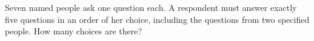 Seven named people ask one question each. A respondent must answer exactly five questions in an order of her choice, including the questions from two specified people. How many choices are there?
